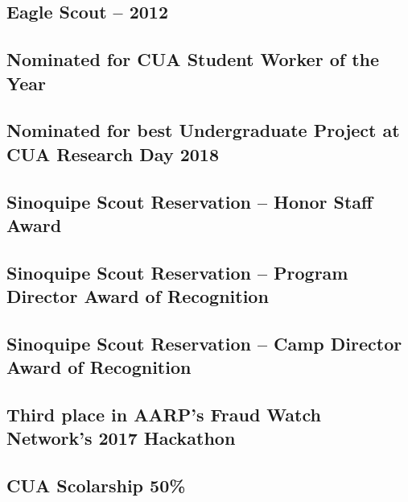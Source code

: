 \documentclass{article}
\begin{document}
\subsection{Eagle Scout -- 2012}
\subsection{Nominated for CUA Student Worker of the Year}
\subsection{Nominated for best Undergraduate Project at CUA Research Day 2018}
\subsection{Sinoquipe Scout Reservation -- Honor Staff Award}
\subsection{Sinoquipe Scout Reservation -- Program Director Award of Recognition}
\subsection{Sinoquipe Scout Reservation -- Camp Director Award of Recognition}
\subsection{Third place in AARP's Fraud Watch Network's 2017 Hackathon}
\subsection{CUA Scolarship 50\%}
\end{document}
